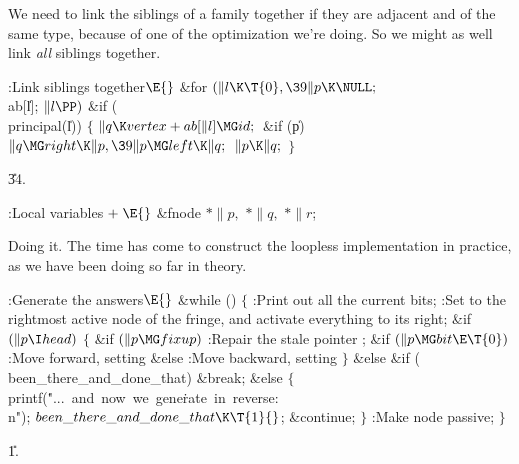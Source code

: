 We need to link the siblings of a family together if they are adjacent
and
of the same type, because of one of the optimization we're doing.
So we might as well link {\it all\/} siblings together.

\Y\B\4:Link siblings together\X${}\E{}$\6
\&{for} ${}(\|l\K\T{0},\39\|p\K\NULL;{}$ \\{ab}[\|l]; ${}\|l\PP){}$\1\6
\&{if} (\\{principal}(\|l))\5
${}\{{}$\1\6
${}\|q\K\\{vertex}+\\{ab}[\|l]\MG\\{id};{}$\6
\&{if} (\|p)\1\5
${}\|q\MG\\{right}\K\|p,\39\|p\MG\\{left}\K\|q;{}$\2\6
${}\|p\K\|q;{}$\6
\4${}\}{}$\2\2\par
\U34.\fi

\B{}:Local variables\X${}\mathrel+\E{}$\6
\&{fnode} ${}{*}\|p,{}$ ${}{*}\|q,{}$ ${}{*}\|r{}$;\par
\fi

Doing it. The time has come to construct the loopless implementation
in practice, as we have been doing so far in theory.

\Y\B\4:Generate the answers\X${}\E{}$\6
\&{while} ()\5
${}\{{}$\1\6
:Print out all the current bits\X;\6
:Set  to the rightmost active node of the fringe, and activate
everything to its right\X;\6
\&{if} ${}(\|p\I\\{head}){}$\5
${}\{{}$\1\6
\&{if} ${}(\|p\MG\\{fixup}){}$\1\5
:Repair the stale pointer \X;\2\6
\&{if} ${}(\|p\MG\\{bit}\E\T{0}){}$\1\5
:Move forward, setting \X\2\6
\&{else}\1\5
:Move backward, setting \X\2\6
\4${}\}{}$\5
\2\&{else} \&{if} (\\{been\_there\_and\_done\_that})\1\5
\&{break};\2\6
\&{else}\5
${}\{{}$\1\6
\\{printf}(\.{"...\ and\ now\ we\ gene}\)\.{rate\ in\ reverse:\\n"});\6
${}\\{been\_there\_and\_done\_that}\K\T{1}{}$;\5
\&{continue};\6
\4${}\}{}$\2\6
:Make node  passive\X;\6
\4${}\}{}$\2\par
\U1.\fi

